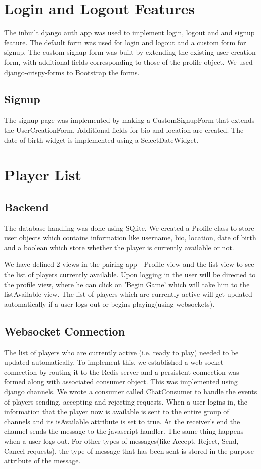 \documentclass[titlepage]{article}
\begin{document}
\section{Login and Logout Features}
The inbuilt django auth app was used to implement login, logout and and signup feature. The default form was used for login and logout and a custom form for signup. The custom signup form was built by extending the existing user creation form, with additional fields corresponding to those of the profile object. We used     django-crispy-forms to Bootstrap the forms.
\subsection{Signup}
The signup page was implemented by making a CustomSignupForm that extends the UserCreationForm. Additional fields for bio and location are created. The date-of-birth widget is implemented using a SelectDateWidget.
\section{Player List}
\subsection{Backend}
 The database handling was done using SQlite. We created a Profile class to store user objects which contains information like username, bio, location, date of birth and a boolean which store whether the player is currently available or not.

 We have defined 2 views in the pairing app - Profile view and the list view to see the list of players currently available. Upon logging in the user will be directed to the profile view, where he can click on 'Begin Game' which will take him to the listAvailable view. The list of players which are currently active will get updated automatically if a user logs out or begins playing(using websockets).

\subsection{Websocket Connection}
The list of players who are currently active (i.e. ready to play) needed to be updated automatically. To implement this, we established a web-socket connection by routing it to the Redis server and a persistent connection was formed along with associated consumer object. This was implemented using django channels. We wrote a consumer called ChatConsumer to handle the events of players sending, accepting and rejecting requests. When a user logins in, the information that the player now is available is sent to the entire group of channels and its isAvailable attribute is set to true. At the receiver's end the channel sends the message to the javascript handler. The same thing happens when a user logs out. For other types of messages(like Accept, Reject, Send, Cancel requests), the type of message that has been sent is stored in the purpose attribute of the message.
\end{document}
